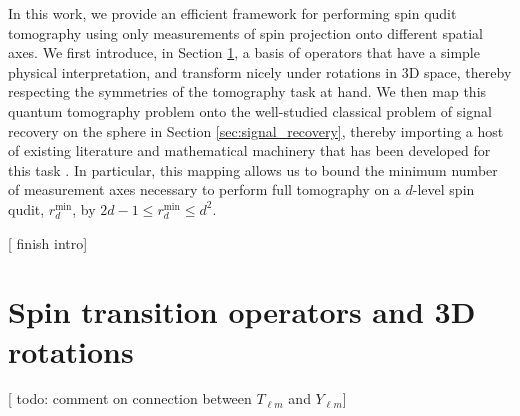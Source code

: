 \documentclass[notitlepage,twocolumn]{revtex4-2}
\renewcommand{\t}{\text} %
\newcommand{\red}[1]{{\color{red} #1}}
\begin{document}
In this work, we provide an efficient framework for performing spin qudit tomography using only measurements of spin projection onto different spatial axes.
We first introduce, in Section \ref{sec:transition_ops}, a basis of operators that have a simple physical interpretation, and transform nicely under rotations in 3D space, thereby respecting the symmetries of the tomography task at hand.
We then map this quantum tomography problem onto the well-studied classical problem of signal recovery on the sphere in Section \ref{sec:signal_recovery}, thereby importing a host of existing literature and mathematical machinery that has been developed for this task \cite{mcewen2011novel, rauhut2011sparse, alem2012sparse, khalid2014optimaldimensionality}.
In particular, this mapping allows us to bound the minimum number of measurement axes necessary to perform full tomography on a $d$-level spin qudit, $r_d^{\t{min}}$, by $2d-1\le r_d^{\t{min}}\le d^2$.

[\red{finish intro}]

\section{Spin transition operators and 3D rotations}
\label{sec:transition_ops}

[\red{todo: comment on connection between $T_{\ell m}$ and $Y_{\ell m}$}]
\end{document}
